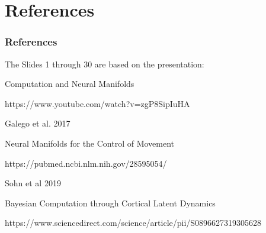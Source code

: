 \documentclass{beamer}
\begin{document}

\section{References}
\begin{frame}
\frametitle{References}

The Slides 1 through 30 are based on the presentation:

Computation and Neural Manifolds

https://www.youtube.com/watch?v=zgP8SipIuHA

Galego et al. 2017

Neural Manifolds for the Control of Movement

https://pubmed.ncbi.nlm.nih.gov/28595054/

Sohn et al 2019

Bayesian Computation through Cortical Latent Dynamics

https://www.sciencedirect.com/science/article/pii/S0896627319305628


\end{frame}

\end{document}
